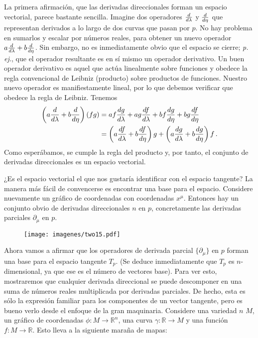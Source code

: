 \documentclass[11pt,b5paper,openany,twoside]{book}
\newcommand{\p}[1]{{\partial_{#1}}}
\newcommand{\R}{\mathbb{R}}
\begin{document}
La primera afirmación, que las derivadas direccionales forman un espacio vectorial, parece bastante sencilla.
Imagine dos operadores ${d\over{d\lambda}}$ y ${d\over{d\eta}}$ que representan derivados a lo largo de dos curvas que pasan por $p$.
No hay problema en sumarlos y escalar por números reales, para obtener un nuevo operador $a{d\over{d\lambda}}+ b{d\over{d\eta}}$.
Sin embargo, no es inmediatamente obvio que el espacio se cierre; {\it p. ej.}, que el operador resultante es en sí mismo un operador derivativo.
Un buen operador derivativo es aquel que actúa linealmente sobre funciones y obedece la regla convencional de Leibniz (producto) sobre productos de funciones.
Nuestro nuevo operador es manifiestamente lineal, por lo que debemos verificar que obedece la regla de Leibniz.
Tenemos
\begin{align}
\left(a{d\over{d\lambda}}+ b{d\over{d\eta}}\right)(fg)
&= af{{dg}\over{d\lambda}} + ag{{df}\over{d\lambda}} +
bf{{dg}\over{d\eta}} + bg{{df}\over{d\eta}} \nonumber \\
&= \left(a{{df}\over{d\lambda}}+ b{{df}\over{d\eta}}\right)g +
\left(a{{dg}\over{d\lambda}}+ b{{dg}\over{d\eta}}\right)f\,.
\label{2.8}
\end{align}
Como esperábamos, se cumple la regla del producto y, por tanto, el conjunto de derivadas direccionales es un espacio vectorial.

¿Es el espacio vectorial el que nos gustaría identificar con el espacio tangente? La manera más fácil de convencerse es encontrar una base para el espacio.
Considere nuevamente un gráfico de coordenadas con coordenadas $x^\mu$.
Entonces hay un conjunto obvio de derivadas direccionales $n$ en $p$, concretamente las derivadas parciales $\p\mu$ en $p$.

\begin{figure}[h]
\centering
\texttt{[image: imagenes/two15.pdf]}
\end{figure}

\noindent
Ahora vamos a afirmar que los operadores de derivada parcial $\{\p\mu\}$ en $p$ forman una base para el espacio tangente $T_p$.
(Se deduce inmediatamente que $T_p$ es $n$-dimensional, ya que ese es el número de vectores base).
Para ver esto, mostraremos que cualquier derivada direccional se puede descomponer en una suma de números reales multiplicada por derivadas parciales.
De hecho, esta es sólo la expresión familiar para los componentes de un vector tangente, pero es bueno verlo desde el enfoque de la gran maquinaria.
Considere una variedad $n$ $M$, un gráfico de coordenadas $\phi:M\rightarrow \R^n$, una curva $\gamma:\R\rightarrow M$ y una función $f:M\rightarrow\R$.
Esto lleva a la siguiente maraña de mapas:
\end{document}
